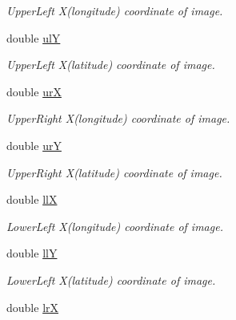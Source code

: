 \begin{DoxyCompactItemize}
\begin{DoxyCompactList}\small\item\em UpperLeft X(longitude) coordinate of image. \end{DoxyCompactList}\item 
\hypertarget{class_geomap3_d_a47859f043c3c3d76434402ce098401fc}{
double \hyperlink{class_geomap3_d_a47859f043c3c3d76434402ce098401fc}{ulY}}
\label{class_geomap3_d_a47859f043c3c3d76434402ce098401fc}

\begin{DoxyCompactList}\small\item\em UpperLeft X(latitude) coordinate of image. \end{DoxyCompactList}\item 
\hypertarget{class_geomap3_d_a6429876f0d9be0dea0bcbe89720c4b64}{
double \hyperlink{class_geomap3_d_a6429876f0d9be0dea0bcbe89720c4b64}{urX}}
\label{class_geomap3_d_a6429876f0d9be0dea0bcbe89720c4b64}

\begin{DoxyCompactList}\small\item\em UpperRight X(longitude) coordinate of image. \end{DoxyCompactList}\item 
\hypertarget{class_geomap3_d_a265ca0ef3d96aefc12d07bd1e7bebb77}{
double \hyperlink{class_geomap3_d_a265ca0ef3d96aefc12d07bd1e7bebb77}{urY}}
\label{class_geomap3_d_a265ca0ef3d96aefc12d07bd1e7bebb77}

\begin{DoxyCompactList}\small\item\em UpperRight X(latitude) coordinate of image. \end{DoxyCompactList}\item 
\hypertarget{class_geomap3_d_a31bd48717256e41f9aaabdaabecbedb9}{
double \hyperlink{class_geomap3_d_a31bd48717256e41f9aaabdaabecbedb9}{llX}}
\label{class_geomap3_d_a31bd48717256e41f9aaabdaabecbedb9}

\begin{DoxyCompactList}\small\item\em LowerLeft X(longitude) coordinate of image. \end{DoxyCompactList}\item 
\hypertarget{class_geomap3_d_aff7114569371da8b89802fcb689e2427}{
double \hyperlink{class_geomap3_d_aff7114569371da8b89802fcb689e2427}{llY}}
\label{class_geomap3_d_aff7114569371da8b89802fcb689e2427}

\begin{DoxyCompactList}\small\item\em LowerLeft X(latitude) coordinate of image. \end{DoxyCompactList}\item 
\hypertarget{class_geomap3_d_ab367354c091837b2085cfbfe6f0d786f}{
double \hyperlink{class_geomap3_d_ab367354c091837b2085cfbfe6f0d786f}{lrX}}
\label{class_geomap3_d_ab367354c091837b2085cfbfe6f0d786f}


\end{DoxyCompactItemize}
